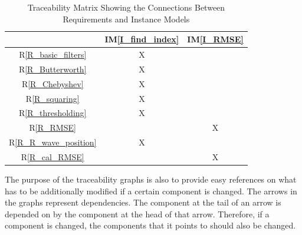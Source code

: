 \documentclass[12pt]{article}
\newcommand{\iref}[1]{IM\ref{#1}} \newcounter{reqnum} %
\newcommand{\rref}[1]{R\ref{#1}} \newcounter{nfrnum} %
\begin{document}
\begin{table}[htbp!]
\centering
\begin{tabular}{|c|c|c|}
\hline
	& \iref{I_find_index}& \iref{I_RMSE} \\
\hline
\rref{R_basic_filters}     & X&  \\ \hline
\rref{R_Butterworth}       & X&  \\ \hline
\rref{R_Chebyshev}         & X&  \\ \hline
\rref{R_squaring}          & X&  \\ \hline
\rref{R_thresholding}      & X&  \\ \hline
\rref{R_RMSE}              & & X \\ \hline
\rref{R_R_wave_position}   & X&  \\ \hline
\rref{R_cal_RMSE}          & & X \\
\hline
\end{tabular}
\caption{Traceability Matrix Showing the Connections Between Requirements and Instance Models}
\label{Table:R_trace}
\end{table}

The purpose of the traceability graphs is also to provide easy references on
what has to be additionally modified if a certain component is changed.  The
arrows in the graphs represent dependencies. The component at the tail of an
arrow is depended on by the component at the head of that arrow. Therefore, if a
component is changed, the components that it points to should also be changed.



\end{document}

